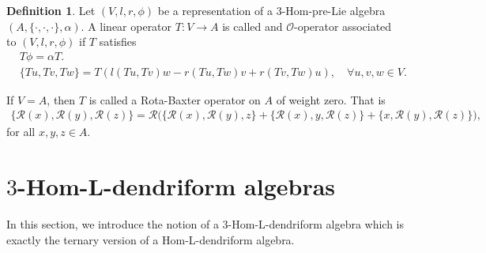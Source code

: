 \documentclass[a4paper,11pt]{article}
\def\c{\cdot}
\theoremstyle{definition}
\newtheorem{defi}{Definition}[section]
\begin{document}
\begin{defi}
 Let $(V,l,r,\phi)$ be a representation of a $3$-Hom-pre-Lie algebra $(A,\{\c,\c,\c\},\alpha)$. A linear operator $T: V \to A$ is called and $\mathcal{O}$-operator associated to $(V,l,r,\phi)$ if $T$ satisfies
 \begin{eqnarray}\label{O-op 3-pre-Lie}
   &T\phi=\alpha T.&\nonumber\\
   & \{Tu,Tv,Tw\}=T\left(l(Tu,Tv)w-r(Tu,Tw)v+r(Tv,Tw)u\right),\quad \forall u,v,w\in V.&
 \end{eqnarray}
\end{defi}
If $V=A$, then $T$ is called a Rota-Baxter operator on $A$ of weight zero. That is
\begin{align*}
\{\mathcal R(x),\mathcal R(y),\mathcal R(z)\}= \mathcal R\big(\{\mathcal R(x),\mathcal R(y),z\}+\{\mathcal R(x),y,\mathcal R(z)\}+\{x,\mathcal R(y),\mathcal R(z)\}\big),
\end{align*}
for all $x,y,z \in A$.
%

\section{$3$-Hom-L-dendriform algebras}
In this section, we introduce the notion of a $3$-Hom-L-dendriform algebra which is exactly the ternary version of a Hom-L-dendriform algebra.
\end{document}
